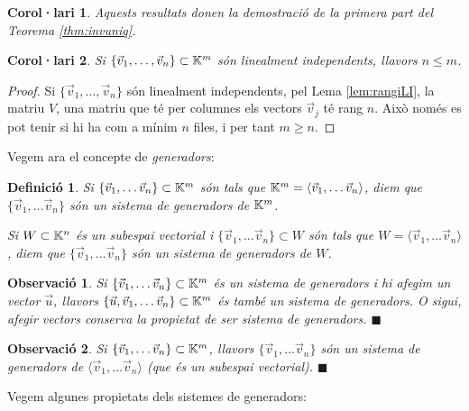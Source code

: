 \documentclass[
  11pt,
]{book}
\numberwithin{dummy}{section}
\theoremstyle{maincolornumbox}
\newtheorem{remarkT}{Observació}[chapter]
\theoremstyle{blacknumex}
\theoremstyle{blacknumbox}
\newtheorem{definitionT}{Definició}[chapter]
\newtheorem{corollaryT}{Corol·lari}[chapter]
\theoremstyle{maincolornum}
\newenvironment{corollary}{\begin{cBox}\begin{corollaryT}}{\end{corollaryT}\end{cBox}}
\newenvironment{definition}{\begin{dBox}\begin{definitionT}}{\end{definitionT}\end{dBox}}
\newenvironment{remark}{\begin{remarkT}}{\hfill{\tiny\ensuremath{\blacksquare}}\end{remarkT}}
\newlength\esp
\begin{document}
\begin{corollary}
\protect\hypertarget{cor:invuniq}{}\label{cor:invuniq}Aquests resultats donen la
demostració de la primera part del Teorema
\ref{thm:invuniq}.
\end{corollary}

\begin{corollary}
\protect\hypertarget{cor:maximLI}{}\label{cor:maximLI}Si
\(\{\vec v_1, \dots, \vec v_n\}\subset \mathbb{K}^m\) són linealment independents,
llavors \(n\leq m\).
\end{corollary}

\begin{proof}
Si \(\{\vec v_1, \dots, \vec v_n\}\) són linealment independents,
pel Lema \ref{lem:rangiLI}, la matriu \(V\), una matriu que té per columnes
els vectors \(\vec v_j\) té rang \(n\). Això només es pot tenir si hi ha com
a mínim \(n\) files, i per tant \(m\geq n\).
\end{proof}

Vegem ara el concepte de \emph{generadors}:

\begin{definition}
\protect\hypertarget{def:sistgen}{}\label{def:sistgen}Si
\(\{\vec v_1, \dots \vec v_n\}\subset \mathbb{K}^m\) són tals que
\(\mathbb{K}^m=\langle \vec v_1, \dots \vec v_n\rangle\), diem que
\emph{\(\{\vec v_1, \dots \vec v_n\}\) són un sistema de generadors de \(\mathbb{K}^m\)}.

Si \(W\subset \mathbb{K}^n\) és un subespai vectorial i
\(\{\vec v_1, \dots \vec v_n\}\subset W\) són tals que
\(W=\langle \vec v_1, \dots \vec v_n\rangle\), diem que
\emph{\(\{\vec v_1, \dots \vec v_n\}\) són un sistema de generadors de \(W\)}.
\end{definition}

\begin{remark}
Si
\(\{\vec v_1, \dots \vec v_n\}\subset \mathbb{K}^m\) és un sistema de generadors i
hi afegim un vector \(\vec u\), llavors
\(\{\vec u,\vec v_1, \dots \vec v_n\}\subset \mathbb{K}^m\) és també un sistema de
generadors. O sigui, afegir vectors conserva la propietat de ser
\emph{sistema de generadors}.
\end{remark}

\begin{remark}
Si \(\{\vec v_1, \dots \vec v_n\}\subset \mathbb{K}^m\), llavors
\(\{\vec v_1, \dots \vec v_n\}\) són un sistema de generadors de
\(\langle \vec v_1, \dots \vec v_n\rangle\) (que és un subespai
vectorial).
\end{remark}

Vegem algunes propietats dels sistemes de generadors:
\end{document}
